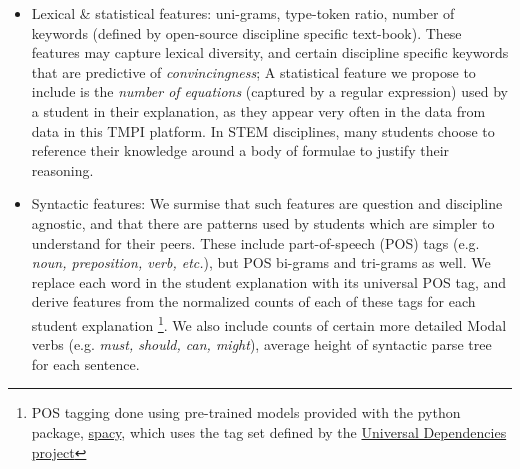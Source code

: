 \documentclass[notitlepage,12pt]{jedm}
\begin{document}
\begin{itemize}
	
	\item Lexical \& statistical features: 
	uni-grams, 
	type-token ratio, 
	number of keywords (defined by open-source discipline specific 
	text-book).
	These features may capture lexical diversity, and certain discipline 
	specific keywords that are predictive of \textit{convincingness};
	A statistical feature we propose to include is the \textit{number of 
	equations} (captured by a regular expression) used by a student in their 
	explanation, as they appear very often in the data from data in this TMPI 
	platform.
	In STEM disciplines, many students choose to reference their knowledge 
	around a body of formulae to justify their reasoning. 
	
	\item Syntactic features: 
	We surmise that such features are question and discipline agnostic, and 
	that there are patterns used by students which are simpler to 
	understand for their peers.
	These include part-of-speech (POS) tags (e.g. \textit{noun, preposition, 
	verb, etc.}), but POS bi-grams and tri-grams as well. 
	We replace each word in the student explanation with its universal POS tag, 
	and derive features from the normalized counts of each of these tags for 
	each student explanation 
	\footnote{POS tagging done using pre-trained models provided with the 
	python package, \href{spacy.io}{spacy}, which uses the tag set defined by 
	the  \href{https://universaldependencies.org/docs/u/pos/}{Universal 
	Dependencies project}}.
	We also include counts of certain more detailed 
	Modal verbs (e.g. \textit{must, should, can, might}),
	average height of syntactic parse tree for each sentence.
	

\end{itemize}
\end{document}
